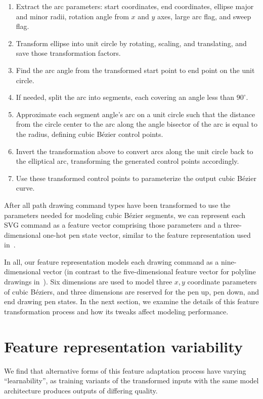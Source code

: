 \begin{enumerate}
    \item Extract the arc parameters: start coordinates, end coordinates, ellipse major and minor radii, rotation angle from $x$ and $y$ axes, large arc flag, and sweep flag. 
    \item Transform ellipse into unit circle by rotating, scaling, and translating, and save those transformation factors.
    \item Find the arc angle from the transformed start point to end point on the unit circle.
    \item If needed, split the arc into segments, each covering an angle less than $90^\circ$.
    \item Approximate each segment angle's arc on a unit circle such that the distance from the circle center to the arc along the angle bisector of the arc is equal to the radius, defining cubic B\'ezier control points.
	\item Invert the transformation above to convert arcs along the unit circle back to the elliptical arc, transforming the generated control points accordingly.
	\item Use these transformed control points to parameterize the output cubic B\'ezier curve.
\end{enumerate}

After all path drawing command types have been transformed to use the parameters needed for modeling cubic B\'ezier segments, we can represent each SVG command as a feature vector comprising those parameters and a three-dimensional one-hot pen state vector, similar to the feature representation used in~\cite{ha2017neural}.

In all, our feature representation models each drawing command as a nine-dimensional vector (in contrast to the five-dimensional feature vector for polyline drawings in~\cite{ha2017neural}).
Six dimensions are used to model three $x, y$ coordinate parameters of cubic B\'eziers, and three dimensions are reserved for the pen up, pen down, and end drawing pen states.
In the next section, we examine the details of this feature transformation process and how its tweaks affect modeling performance.

\section{Feature representation variability}
We find that alternative forms of this feature adaptation process have varying ``learnability'', as training variants of the transformed inputs with the same model architecture produces outputs of differing quality.

